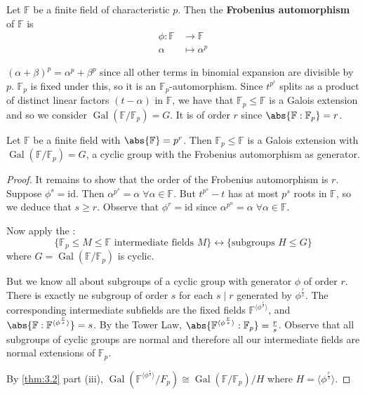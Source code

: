 \documentclass{article}
\DeclareMathOperator{\Gal}{Gal}
\newcommand{\F}{\mathbb{F}}
\begin{document}
\begin{ndef}\label{def:3.15}
    Let $\F$ be a finite field of characteristic $p$.
    Then the \textbf{Frobenius automorphism} of $\F$ is
    \begin{align*}
        \phi: \F &\longrightarrow \F \\
        \alpha &\longmapsto \alpha^p
    \end{align*}
\end{ndef}

\begin{remark}
    $(\alpha+\beta)^p = \alpha^p + \beta^p$ since all other terms in binomial expansion are divisible by $p$.
    $\F_p$ is fixed under this, so it is an $\F_p$-automorphism.
    Since $t^{p^r}$ splits as a product of distinct linear factors $(t-\alpha)$ in $\F$, we have that $\F_p \leq \F$ is a Galois extension and so we consider $\Gal(\F/\F_p) = G$.
    It is of order $r$ since $\abs{\F:\F_p}=r$.
\end{remark}

\begin{nthm}\label{thm:3.16}
    Let $\F$ be a finite field with $\abs{\F} = p^r$.
    Then $\F_p \leq \F$ is a Galois extension with $\Gal(\F/\F_p) = G$, a cyclic group with the Frobenius automorphism as generator.
\end{nthm}

\begin{proof}
    It remains to show that the order of the Frobenius automorphism is $r$.
    Suppose $\phi^s = \mathrm{id}$.
    Then $\alpha^{p^s} = \alpha \; \forall \alpha \in \F$.
    But $t^{p^s} - t$ has at most $p^s$ roots in $\F$, so we deduce that $s \geq r$.
    Observe that $\phi^r = \mathrm{id}$ since $\alpha^{p^n} = \alpha \; \forall \alpha \in \F$.

    Now apply the :
    \begin{equation*}
        \{\F_p \leq M \leq \F \text{ intermediate fields } M\} \longleftrightarrow \{\text{subgroups } H \leq G\}
    \end{equation*}
    where $G = \Gal(\F/\F_p)$ is cyclic.

    But we know all about subgroups of a cyclic group with generator $\phi$ of order $r$.
    There is exactly ne subgroup of order $s$ for each $s \mid r$ generated by $\phi^\frac{r}{s}$.
    The corresponding intermediate subfields are the fixed fields $\F^{\langle \phi^\frac{r}{s} \rangle}$, and $\abs{\F:\F^{\langle \phi^\frac{r}{s} \rangle}} = s$.
    By the Tower Law, $\abs{\F^{\langle \phi^\frac{r}{s} \rangle}:\F_p} = \frac{r}{s}$.
    Observe that all subgroups of cyclic groups are normal and therefore all our intermediate fields are normal extensions of $\F_p$.

    By \cref{thm:3.2} part (iii), $\Gal(\F^{\langle \phi^\frac{r}{s} \rangle}/F_p) \cong \Gal(\F/\F_p) / H$ where $H = \langle \phi^\frac{r}{s} \rangle$.
\end{proof}
\end{document}
